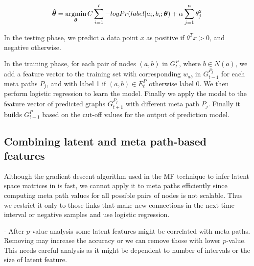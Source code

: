 
\begin{equation}
\boldsymbol{\hat{\theta}} = 
\operatorname*{argmin}\limits_{\boldsymbol{\theta}}C\sum_{i=1}^l -log Pr(label |a_i, b_i; \boldsymbol{\theta}) + \alpha \sum_{j=1}^n \theta_j^2
\end{equation}
  
In the testing phase, we predict a data point $x$ as positive if $\theta^Tx > 0$, and negative otherwise.




In the training phase, for each pair of nodes $(a,b)$ in $G^{P}_{t}$, where $b \in N(a)$, we add a feature vector to the training set with corresponding $w_{ab}$ in $G^{P_j}_{t-1}$ for each meta paths $P_j$, and with label 1 if $(a,b) \in E^{P}_{t}$ otherwise label 0. We then perform logistic regression to learn the model. Finally we apply the model to the feature vector of predicted graphs $G^{P_j}_{t+1}$ with different meta path $P_j$. Finally it builds $G^{P}_{t+1}$ based on the cut-off values for the output of prediction model.


\subsection{Combining latent and meta path-based features}



Although the gradient descent algorithm used in the MF technique to infer latent space matrices in \cite{Zhu2016} is fast, we cannot apply it to meta paths efficiently since computing meta path values for all possible pairs of nodes is not scalable. Thus we restrict it only to those links that make new connections in the next time interval or negative samples and use logistic regression. 

- After $p$-value analysis some latent features might be correlated with meta paths. Removing may increase the accuracy or we can remove those with lower $p$-value. This needs careful analysis as it might be dependent to number of intervals or the size of latent feature.

